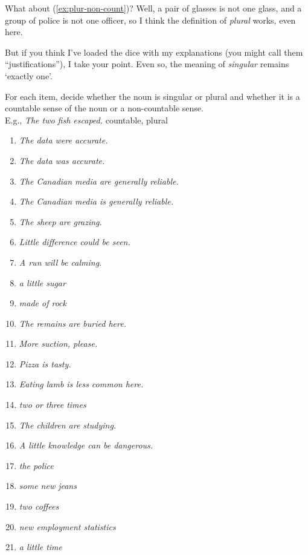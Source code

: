 What about (\ref{ex:plur-non-count})? Well, a pair of glasses is not one glass, and a group of police is not one officer, so I think the definition of \textit{plural} works, even here. 

But if you think I've loaded the dice with my explanations (you might call them ``justifications''), I take your point. Even so, the  meaning of \textit{singular} remains `exactly one'.

\begin{tcolorbox}[title=Practice, colback=white]
    For each item, decide whether the noun is singular or plural and whether it is a countable sense of the noun or a non-countable sense.\\
    E.g., \textit{The two fish escaped.} countable, plural
    
    \begin{enumerate}[noitemsep]
        \item \textit{The data were accurate.}
        \item \textit{The data was accurate.}
        \item \textit{The Canadian media are generally reliable.}
        \item \textit{The Canadian media is generally reliable.}
        \item \textit{The sheep are grazing.}
        \item \textit{Little difference could be seen.}
        \item \textit{A run will be calming.}
        \item \textit{a little sugar}
        \item \textit{made of rock}
        \item \textit{The remains are buried here.}
        \item \textit{More suction, please.}
        \item \textit{Pizza is tasty.}
        \item \textit{Eating lamb is less common here.}
        \item \textit{two or three times}
        \item \textit{The children are studying.}
        \item \textit{A little knowledge can be dangerous.}
        \item \textit{the police}
        \item \textit{some new jeans}
        \item \textit{two coffees}
        \item \textit{new employment statistics}
        \item \textit{a little time}
    \end{enumerate}
\end{tcolorbox}

